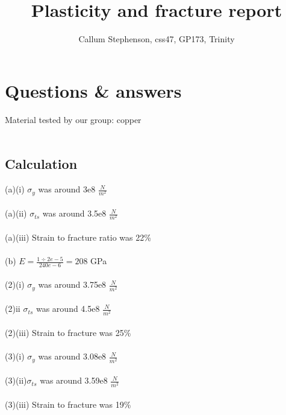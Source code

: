\documentclass[12pt]{article}
\title{\textbf{Plasticity and fracture report}}
\author{Callum Stephenson, css47, GP173, Trinity}
\date{}
\begin{document}
    \begin{titlepage}
        \maketitle
        \thispagestyle{empty}
    \end{titlepage}
    \section{Questions \& answers}
        Material tested by our group: copper \\ \\
        \subsection{Calculation}
            (a)(i) $\sigma_y$ was around 3e8 $\frac{N}{m^2}$ \\ \\
            (a)(ii) $\sigma_{ts}$ was around 3.5e8 $\frac{N}{m^2}$ \\ \\
            (a)(iii) Strain to fracture ratio was 22\% \\ \\
            (b) $E = \frac{1\div2e-5}{240e-6} = 208$ GPa \\ \\
            (2)(i) $\sigma_y$ was around 3.75e8 $\frac{N}{m^2}$  \\ \\
            (2){ii} $\sigma_{ts}$ was around 4.5e8 $\frac{N}{m^2}$ \\ \\
            (2)(iii) Strain to fracture was 25\% \\ \\
            (3)(i) $\sigma_y$ was around 3.08e8 $\frac{N}{m^2}$ \\ \\
            (3)(ii)$\sigma_{ts}$ was around 3.59e8 $\frac{N}{m^2}$ \\ \\
            (3)(iii) Strain to fracture was 19\%
\end{document}
